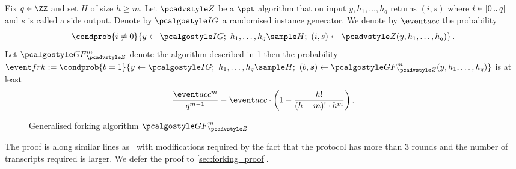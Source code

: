 \begin{lemma}
	\label{lem:generalised_forking_lemma}
	Fix $q \in \ZZ$ and set $H$ of size $h \geq m$. Let $\zdv$ be a $\ppt$
  algorithm that on input $y, h_1, \ldots, h_q$ returns $(i, s)$ where $i \in
  [0 \, .. \, q]$ and $s$ is called a side output. Denote by $\ig$ a randomised
  instance generator. We denote by $\accProb$ the probability
	\[
		\condprob{i \neq 0}{ y \gets \ig;\ h_1, \ldots, h_q \sample H;\ (i, s)
		\gets \zdv(y, h_1, \ldots, h_q)}\,.
	\]
	Let $\genforking_{\zdv}^{m}$ denote the algorithm described in
  \cref{fig:genforking_lemma} then the probability $\frkProb := \condprob{b =
    1}{y \gets \ig;\ h_1, \ldots, h_{q} \sample H;\ (b, \vec{s}) \gets
    \genforking_{\zdv}^{m}(y, h_1, \ldots, h_q)}$ is at least
	\[
		\frac{\accProb^m}{q^{m - 1}} - \accProb \cdot \left(1 -
    \frac{h!}{(h - m)! \cdot h^{m}}\right).
	\]
		
	\begin{figure}[t]
		\centering
	\caption{Generalised forking algorithm $\genforking_{\zdv}^{m}$}
	\label{fig:genforking_lemma}
\end{figure}
\end{lemma}
The proof is along similar lines as~\cite[Lemma 1]{CCS:BelNev06} with modifications required
by the fact that the protocol has more than $3$ rounds and the number of
transcripts required is larger. We defer the proof to
\cref{sec:forking_proof}.


